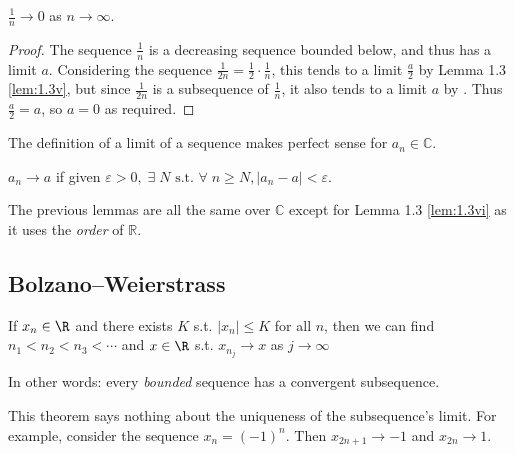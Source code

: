 \begin{lemma}
	$\frac{1}{n} \rightarrow 0$ as $n \rightarrow \infty$.
\end{lemma}
\begin{proof}
	The sequence $\frac{1}{n}$ is a decreasing sequence bounded below, and thus has a limit $a$. Considering the sequence $\frac{1}{2n} = \frac{1}{2}\cdot \frac{1}{n}$, this tends to a limit $\frac{a}{2}$ by Lemma 1.3 \ref{lem:1.3v}, but since $\frac{1}{2n}$ is a subsequence of $\frac{1}{n}$, it also tends to a limit $a$ by . Thus $\frac{a}{2} = a$, so $a = 0$ as required.
\end{proof}

\begin{remark}
	The definition of a limit of a sequence makes perfect sense for $a_n \in \mathbb{C}$.
\end{remark} 

\begin{definition}
	$a_n \to a$ if given $\varepsilon > 0,\; \exists \; N \text{ s.t. } \forall \; n \geq N, |a_n - a| < \varepsilon$.
\end{definition} 

The previous lemmas are all the same over $\mathbb{C}$ except for Lemma 1.3 \ref{lem:1.3vi} as it uses the \emph{order} of $\mathbb{R}$.

\subsection{Bolzano–Weierstrass}

\begin{theorem}\label{thm:bolzano}
	If $x_n \in \R$ and there exists $K$ s.t. $|x_n| \leq K$ for all $n$, then we can find $n_1 < n_2 < n_3 < \cdots$ and $x \in \R$ s.t. $x_{n_j} \to x$ as $j \to \infty$

	In other words: every \emph{bounded} sequence has a convergent subsequence.
\end{theorem}

\begin{remark}
	This theorem says nothing about the uniqueness of the subsequence's limit. For example, consider the sequence $x_n = (-1)^n$. Then $x_{2n + 1} \rightarrow -1$ and $x_{2n} \rightarrow 1$.
\end{remark}

